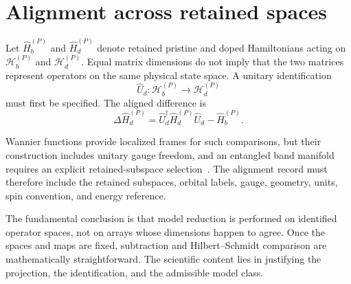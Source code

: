 \section*{Alignment across retained spaces}

Let $\hat H_b^{(P)}$ and $\hat H_d^{(P)}$ denote retained pristine and doped
Hamiltonians acting on $\mathcal H_b^{(P)}$ and $\mathcal H_d^{(P)}$. Equal
matrix dimensions do not imply that the two matrices represent operators on
the same physical state space. A unitary identification
\begin{equation}
    \hat U_d:
    \mathcal H_b^{(P)}
    \longrightarrow
    \mathcal H_d^{(P)}
\end{equation}
must first be specified. The aligned difference is
\begin{equation}
    \Delta\hat H_d^{(P)}
    =
    \hat U_d^\dagger
    \hat H_d^{(P)}
    \hat U_d
    -
    \hat H_b^{(P)}.
\end{equation}

Wannier functions provide localized frames for such comparisons, but their
construction includes unitary gauge freedom, and an entangled band manifold
requires an explicit retained-subspace selection~\cite{marzari2012,souza2001}.
The alignment record must therefore include the retained subspaces, orbital
labels, gauge, geometry, units, spin convention, and energy reference.

The fundamental conclusion is that model reduction is performed on identified
operator spaces, not on arrays whose dimensions happen to agree. Once the
spaces and maps are fixed, subtraction and Hilbert--Schmidt comparison are
mathematically straightforward. The scientific content lies in justifying the
projection, the identification, and the admissible model class.
